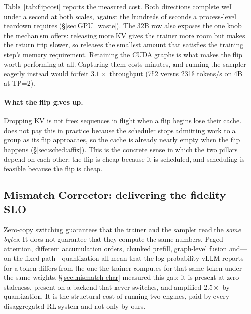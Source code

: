 Table~\ref{tab:flipcost} reports the measured cost. Both directions complete well under
a second at both scales, against the hundreds of seconds a process-level teardown
requires (\S\ref{sec:GPU_waste}). The 32B row also exposes the one knob the mechanism
offers: releasing more KV gives the trainer more room but makes the return trip slower,
so \sysname releases the smallest amount that satisfies the training step's memory
requirement. Retaining the CUDA graphs is what makes the flip worth performing at all.
Capturing them costs minutes, and running the sampler eagerly instead would forfeit
$3.1\times$ throughput (752 versus 2318 tokens/s on 4B at TP=2).

\paragraph{What the flip gives up.} Dropping KV is not free: sequences in flight when a
flip begins lose their cache. \sysname does not pay this in practice because the
scheduler stops admitting work to a group as its flip approaches, so the cache is
already nearly empty when the flip happens (\S\ref{sec:sched:affix}). This is the
concrete sense in which the two pillars depend on each other: the flip is cheap because
it is scheduled, and scheduling is feasible because the flip is cheap.

\subsection{Mismatch Corrector: delivering the fidelity SLO}
\label{sec:mismatch-pred}

Zero-copy switching guarantees that the trainer and the sampler read the \emph{same
bytes}. It does not guarantee that they compute the same numbers. Paged attention,
different accumulation orders, chunked prefill, graph-level fusion and---on the fixed
path---quantization all mean that the log-probability vLLM reports for a token differs
from the one the trainer computes for that same token under the same weights.
\S\ref{sec:mismatch-char} measured this gap: it is present at zero staleness, present
on a backend that never switches, and amplified $2.5\times$ by quantization. It is the
structural cost of running two engines, paid by every disaggregated RL system and not
only by ours.


